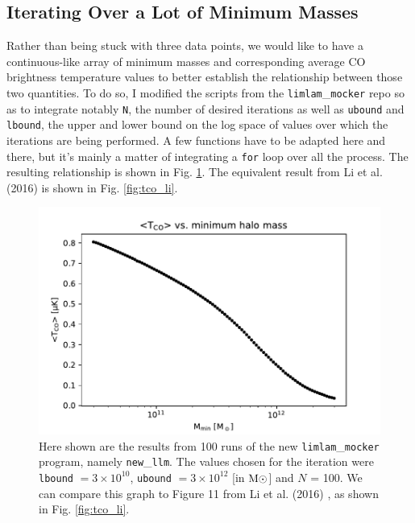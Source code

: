 \documentclass[apj]{emulateapj}
\begin{document}
\subsection{Iterating Over a Lot of Minimum Masses}
Rather than being stuck with three data points, we would like to have a continuous-like array of minimum masses and corresponding average CO brightness temperature values to better establish the relationship between those two quantities. To do so, I modified the scripts from the \texttt{limlam}\_\texttt{mocker} repo so as to integrate notably \texttt{N}, the number of desired iterations as well as \texttt{ubound} and \texttt{lbound}, the upper and lower bound on the log space of values over which the iterations are being performed. A few functions have to be adapted here and there, but it's mainly a matter of integrating a \texttt{for} loop over all the process. The resulting relationship is shown in Fig. \ref{fig:tco_full}. The equivalent result from Li et al. (2016) \cite{Li_2016} is shown in Fig. \ref{fig:tco_li}. 

\pagebreak


\begin{figure}[h!]
    \includegraphics[width=\linewidth]{tco_full.pdf}
  \caption{Here shown are the results from 100 runs of the new \texttt{limlam}\_\texttt{mocker} program, namely \texttt{new}\_\texttt{llm}. The values chosen for the iteration were \texttt{lbound} $ = 3 \times 10^{10}$, \texttt{ubound} $ = 3 \times 10^{12}$ [in $\rm{M\odot}$] and $N$ = 100. We can compare this graph to Figure 11 from Li et al. (2016) \cite{Li_2016}, as shown in Fig. \ref{fig:tco_li}. }
  \label{fig:tco_full}
\end{figure}
  
\end{document}
